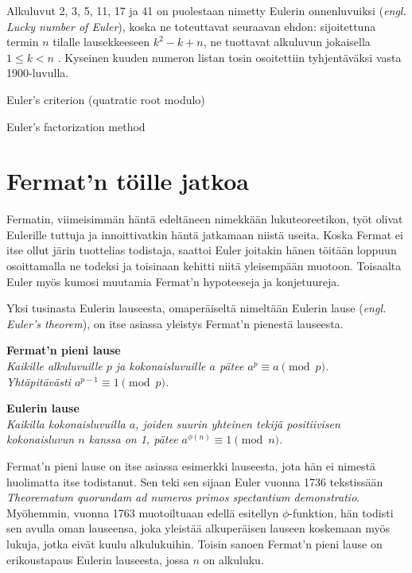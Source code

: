 \documentclass[a4paper,11pt]{article}
\begin{document}
Alkuluvut 2, 3, 5, 11, 17 ja 41 on puolestaan nimetty Eulerin onnenluvuiksi (\textit{engl. Lucky number of Euler}), koska ne toteuttavat seuraavan ehdon: sijoitettuna termin $n$ tilalle lausekkeeseen $k^2-k+n$, ne tuottavat alkuluvun jokaisella $1\leq k<n$ \cite{onnenluku}. Kyseinen kuuden numeron listan tosin osoitettiin tyhjentäväksi vasta 1900-luvulla.

Euler's criterion (quatratic root modulo)

Euler's factorization method

\section{Fermat'n töille jatkoa}

Fermatin, viimeisimmän häntä edeltäneen nimekkään lukuteoreetikon, työt olivat Eulerille tuttuja ja innoittivatkin häntä jatkamaan niistä useita. Koska Fermat ei itse ollut järin tuottelias todistaja, saattoi Euler joitakin hänen töitään loppuun osoittamalla ne todeksi ja toisinaan kehitti niitä yleisempään muotoon. Toisaalta Euler myös kumosi muutamia Fermat'n hypoteeseja ja konjetuureja.

Yksi tusinasta Eulerin lauseesta, omaperäiseltä nimeltään Eulerin lause (\textit{engl. Euler's theorem}), on itse asiassa yleistys Fermat'n pienestä lauseesta.

\begin{center}
    \textbf{Fermat'n pieni lause}\\
    \textit{Kaikille alkuluvuille $p$ ja kokonaisluvuille $a$ pätee $a^p\equiv a \pmod{p}$.\\
    Yhtäpitävästi $a^{p-1}\equiv 1 \pmod{p}$.}
\end{center}

\begin{center}
    \textbf{Eulerin lause}\\
    \textit{Kaikilla kokonaisluvuilla $a$, joiden suurin yhteinen tekijä positiivisen kokonaisluvun $n$ kanssa on 1, pätee $a^{\phi(n)}\equiv 1 \pmod{n}$.}
\end{center}

Fermat'n pieni lause on itse asiassa esimerkki lauseesta, jota hän ei nimestä huolimatta itse todistanut. Sen teki sen sijaan Euler vuonna 1736 tekstissään \textit{Theorematum quorundam ad numeros primos spectantium demonstratio}. Myöhemmin, vuonna 1763 muotoiltuaan edellä esitellyn $\phi$-funktion, hän todisti sen avulla oman lauseensa, joka yleistää alkuperäisen lauseen koskemaan myös lukuja, jotka eivät kuulu alkulukuihin. Toisin sanoen Fermat'n pieni lause on erikoustapaus Eulerin lauseesta, jossa $n$ on alkuluku.
\end{document}
